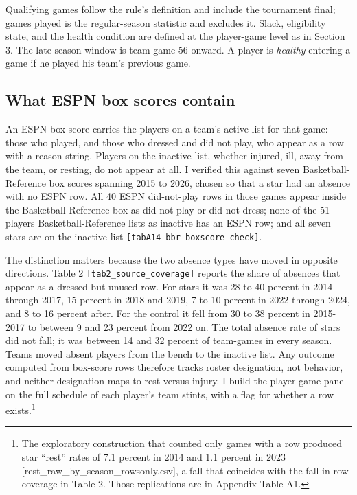 \documentclass[11pt]{article}
\begin{document}
Qualifying games follow the rule's definition and include the tournament final; games played is the regular-season statistic and excludes it. Slack, eligibility state, and the health condition are defined at the player-game level as in Section 3. The late-season window is team game 56 onward. A player is \emph{healthy} entering a game if he played his team's previous game.


\subsection*{What ESPN box scores contain}


An ESPN box score carries the players on a team's active list for that game: those who played, and those who dressed and did not play, who appear as a row with a reason string. Players on the inactive list, whether injured, ill, away from the team, or resting, do not appear at all. I verified this against seven Basketball-Reference box scores spanning 2015 to 2026, chosen so that a star had an absence with no ESPN row. All 40 ESPN did-not-play rows in those games appear inside the Basketball-Reference box as did-not-play or did-not-dress; none of the 51 players Basketball-Reference lists as inactive has an ESPN row; and all seven stars are on the inactive list {\small\texttt{[tabA14\_bbr\_boxscore\_check]}}.

The distinction matters because the two absence types have moved in opposite directions. Table 2 {\small\texttt{[tab2\_source\_coverage]}} reports the share of absences that appear as a dressed-but-unused row. For stars it was 28 to 40 percent in 2014 through 2017, 15 percent in 2018 and 2019, 7 to 10 percent in 2022 through 2024, and 8 to 16 percent after. For the control it fell from 30 to 38 percent in 2015-2017 to between 9 and 23 percent from 2022 on. The total absence rate of stars did not fall; it was between 14 and 32 percent of team-games in every season. Teams moved absent players from the bench to the inactive list. Any outcome computed from box-score rows therefore tracks roster designation, not behavior, and neither designation maps to rest versus injury. I build the player-game panel on the full schedule of each player's team stints, with a flag for whether a row exists.\footnote{The exploratory construction that counted only games with a row produced star ``rest'' rates of 7.1 percent in 2014 and 1.1 percent in 2023 [rest\_raw\_by\_season\_rowsonly.csv], a fall that coincides with the fall in row coverage in Table 2. Those replications are in Appendix Table A1.}
\end{document}
